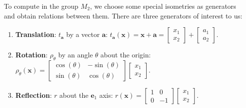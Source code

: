 \documentclass[11pt]{article}
\renewcommand{\vec}[1]{\mathbf{#1}}
\begin{document}
To compute in the group $M_{2}$, we choose some special isometries as generators and obtain relations between them. There are three generators of interest to us:
\begin{enumerate}
	\item \textbf{Translation}: $t_{\vec{a}}$ by a vector $\vec{a}$: $t_{\vec{a}}(\vec{x}) = \vec{x} + \vec{a} = \begin{bmatrix} x_{1} \\ x_{2} \end{bmatrix} + \begin{bmatrix} a_{1} \\ a_{2} \end{bmatrix}$.
	\item \textbf{Rotation}: $\rho_{\theta}$ by an angle $\theta$ about the origin: $\rho_{\theta}(\vec{x}) = \begin{bmatrix} \cos(\theta) & -\sin(\theta) \\ \sin(\theta) & \cos(\theta) \end{bmatrix} \begin{bmatrix} x_{1} \\ x_{2} \end{bmatrix}$.
	\item \textbf{Reflection}: $r$ about the $\vec{e}_{1}$ axis: $r(\vec{x}) = \begin{bmatrix} 1 & 0 \\ 0 & -1 \end{bmatrix} \begin{bmatrix} x_{1} \\ x_{2} \end{bmatrix}$.
\end{enumerate}
\end{document}
